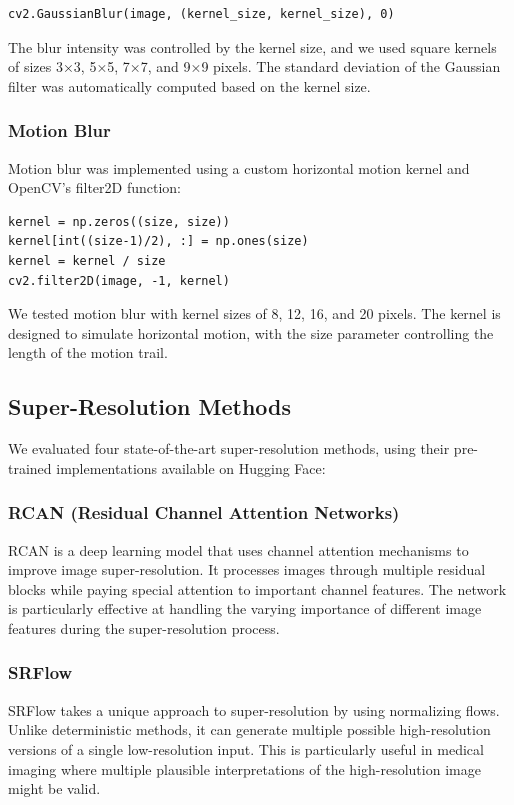 \documentclass[a4paper,12pt]{article}
\begin{document}
\begin{verbatim}
cv2.GaussianBlur(image, (kernel_size, kernel_size), 0)
\end{verbatim}

The blur intensity was controlled by the kernel size, and we used square kernels of sizes 3×3, 5×5, 7×7, and 9×9 pixels. The standard deviation of the Gaussian filter was automatically computed based on the kernel size.

\subsubsection{Motion Blur}
Motion blur was implemented using a custom horizontal motion kernel and OpenCV's filter2D function:

\begin{verbatim}
kernel = np.zeros((size, size))
kernel[int((size-1)/2), :] = np.ones(size)
kernel = kernel / size
cv2.filter2D(image, -1, kernel)
\end{verbatim}

We tested motion blur with kernel sizes of 8, 12, 16, and 20 pixels. The kernel is designed to simulate horizontal motion, with the size parameter controlling the length of the motion trail.


\subsection{Super-Resolution Methods}
We evaluated four state-of-the-art super-resolution methods, using their pre-trained implementations available on Hugging Face:
\subsubsection{RCAN (Residual Channel Attention Networks)}
RCAN \cite{zhang_image_2018} is a deep learning model that uses channel attention mechanisms to improve image super-resolution. It processes images through multiple residual blocks while paying special attention to important channel features. The network is particularly effective at handling the varying importance of different image features during the super-resolution process.
\subsubsection{SRFlow}
SRFlow \cite{lugmayr_srflow_2020} takes a unique approach to super-resolution by using normalizing flows. Unlike deterministic methods, it can generate multiple possible high-resolution versions of a single low-resolution input. This is particularly useful in medical imaging where multiple plausible interpretations of the high-resolution image might be valid.
\end{document}
